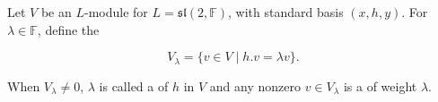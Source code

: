 Let $V$ be an $L$-module for $L = \mathfrak{sl}(2, \mathbb{F})$, with standard basis $(x, h, y)$. For $\lambda \in \mathbb{F}$, define the 

$$V_\lambda = \{v \in V \mid h.v = \lambda v\}.$$

When $V_\lambda \neq 0$, $\lambda$ is called a  of $h$ in $V$ and any nonzero $v \in V_\lambda$ is a  of weight $\lambda$.
